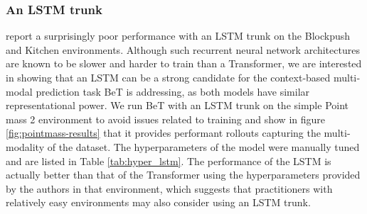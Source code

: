 \subsubsection{An LSTM trunk}\label{sec:lstm-baseline}
\citet{shafiullah2022behavior} report a surprisingly poor performance with an LSTM trunk on the Blockpush and Kitchen environments.
Although such recurrent neural network architectures are known to be slower and harder to train than a Transformer,
we are interested in showing that an LSTM can be a strong candidate for the context‐based multi‐modal prediction task BeT is addressing,
as both models have similar representational power.
We run BeT with an LSTM trunk on the simple Point mass 2 environment to avoid issues related to training and show in figure \ref{fig:pointmass-results} that it provides performant rollouts capturing the multi-modality of the dataset.
The hyperparameters of the model were manually tuned and are listed in Table \ref{tab:hyper_lstm}.
The performance of the LSTM is actually better than that of the Transformer using the hyperparameters provided by the authors in that environment, which suggests that practitioners with relatively easy environments may also consider using an LSTM trunk.
